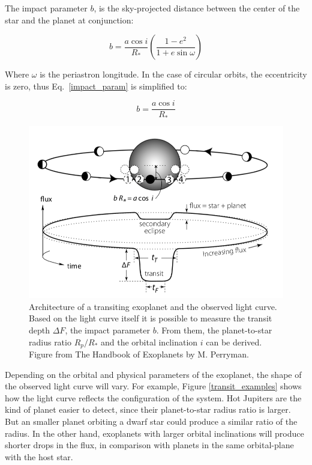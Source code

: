 The impact parameter $b$, is the sky-projected distance between the center of the star and the planet at conjunction:

\begin{equation}
    b = \frac{a\cos{i}}{R_{*}}\left(\frac{1-e^2}{1+e\sin{\omega}}\right)
\label{impact_param}
\end{equation}

Where $\omega$ is the periastron longitude. In the case of circular orbits, the eccentricity is zero, thus Eq.~\ref{impact_param} is simplified to:

\begin{equation}
    b = \frac{a\cos{i}}{R_{*}}
\label{impact_param_simple}
\end{equation}

\begin{figure}[H]
\centering
\includegraphics[width=0.8\columnwidth]{imagenes/transit.png}
\caption{Architecture of a transiting exoplanet and the observed light curve. Based on the light curve itself it is possible to measure the transit depth $\Delta F$, the impact parameter $b$. From them, the planet-to-star radius ratio $R_{p}/R_{*}$ and the orbital inclination $i$ can be derived. Figure from The Handbook of Exoplanets by M. Perryman.}
\label{transit}
\end{figure}

Depending on the orbital and physical parameters of the exoplanet, the shape of the observed light curve will vary. For example, Figure \ref{transit_examples} shows how the light curve reflects the configuration of the system. Hot Jupiters are the kind of planet easier to detect, since their planet-to-star radius ratio is larger. But an smaller planet orbiting a dwarf star could produce a similar ratio of the radius. In the other hand, exoplanets with larger orbital inclinations will produce shorter drops in the flux, in comparison with planets in the same orbital-plane with the host star.


